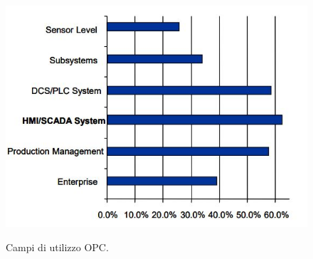 \documentclass[12pt, a4paper, oneside]{book}
\begin{document}
\begin{figure}[H]
	\centering
	\includegraphics[width=13cm]{Immagini/OPC}
	\label{opc}
	\caption{Campi di utilizzo OPC.}
\end{figure}
\end{document}
